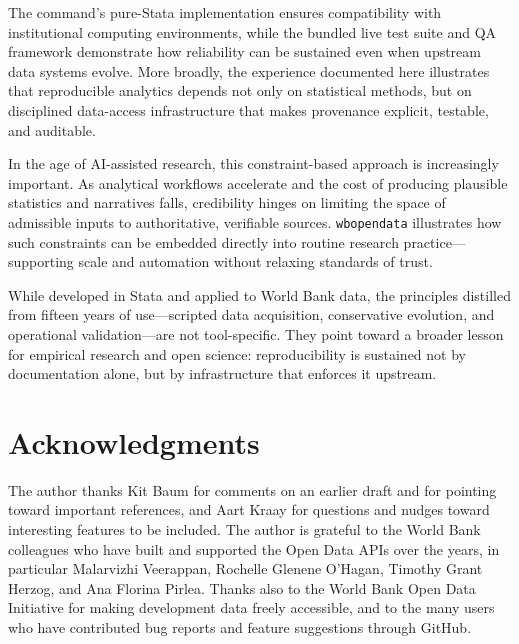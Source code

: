 \documentclass[bib]{statapress}
\begin{document}
The command’s pure-Stata implementation ensures compatibility with institutional
computing environments, while the bundled live test suite and QA framework
demonstrate how reliability can be sustained even when upstream data systems
evolve. More broadly, the experience documented here illustrates that reproducible
analytics depends not only on statistical methods, but on disciplined data-access
infrastructure that makes provenance explicit, testable, and auditable.

In the age of AI-assisted research, this constraint-based approach is increasingly
important. As analytical workflows accelerate and the cost of producing plausible
statistics and narratives falls, credibility hinges on limiting the space of
admissible inputs to authoritative, verifiable sources. \texttt{wbopendata}
illustrates how such constraints can be embedded directly into routine research
practice—supporting scale and automation without relaxing standards of trust.

While developed in Stata and applied to World Bank data, the principles distilled
from fifteen years of use—scripted data acquisition, conservative evolution, and
operational validation—are not tool-specific. They point toward a broader lesson
for empirical research and open science: reproducibility is sustained not by
documentation alone, but by infrastructure that enforces it upstream.


\section*{Acknowledgments}

The author thanks Kit Baum for comments on an earlier draft and for pointing toward important references, and Aart Kraay for questions and nudges toward interesting features to be included.  The author is grateful to the World Bank colleagues who have built and supported the Open Data APIs over the years, in particular Malarvizhi Veerappan, Rochelle Glenene O'Hagan, Timothy Grant Herzog, and Ana Florina Pirlea.  Thanks also to the World Bank Open Data Initiative for making development data freely accessible, and to the many users who have contributed bug reports and feature suggestions through GitHub.


\nocite{pisati2007spmap,clarke2012worldstat}

\end{document}
